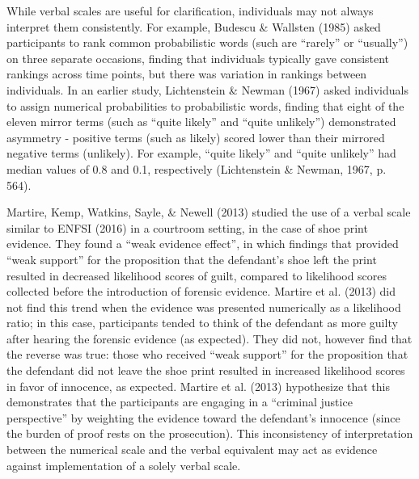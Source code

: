 \documentclass[print]{nuthesis}
\begin{document}
While verbal scales are useful for clarification, individuals may not always interpret them consistently.
For example, Budescu \& Wallsten (1985) asked participants to rank common probabilistic words (such are ``rarely'' or ``usually'') on three separate occasions, finding that individuals typically gave consistent rankings across time points, but there was variation in rankings between individuals.
In an earlier study, Lichtenstein \& Newman (1967) asked individuals to assign numerical probabilities to probabilistic words, finding that eight of the eleven mirror terms (such as ``quite likely'' and ``quite unlikely'') demonstrated asymmetry - positive terms (such as likely) scored lower than their mirrored negative terms (unlikely). For example, ``quite likely'' and ``quite unlikely'' had median values of 0.8 and 0.1, respectively (Lichtenstein \& Newman, 1967, p. 564).

Martire, Kemp, Watkins, Sayle, \& Newell (2013) studied the use of a verbal scale similar to ENFSI (2016) in a courtroom setting, in the case of shoe print evidence.
They found a ``weak evidence effect'', in which findings that provided ``weak support'' for the proposition that the defendant's shoe left the print resulted in decreased likelihood scores of guilt, compared to likelihood scores collected before the introduction of forensic evidence.
Martire et al. (2013) did not find this trend when the evidence was presented numerically as a likelihood ratio; in this case, participants tended to think of the defendant as more guilty after hearing the forensic evidence (as expected).
They did not, however find that the reverse was true: those who received ``weak support'' for the proposition that the defendant did not leave the shoe print resulted in increased likelihood scores in favor of innocence, as expected.
Martire et al. (2013) hypothesize that this demonstrates that the participants are engaging in a ``criminal justice perspective'' by weighting the evidence toward the defendant's innocence (since the burden of proof rests on the prosecution).
This inconsistency of interpretation between the numerical scale and the verbal equivalent may act as evidence against implementation of a solely verbal scale.
\end{document}

